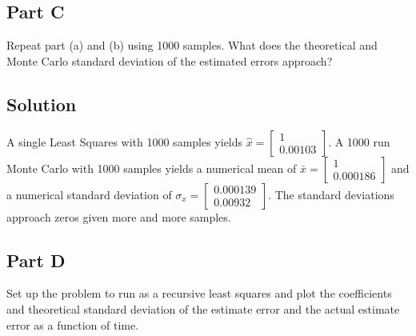 \documentclass{article}
\begin{document}
\subsection*{Part C}
Repeat part (a) and (b) using 1000 samples.  What does the theoretical and Monte Carlo standard deviation of the estimated errors approach?
\subsection*{Solution}
A single Least Squares with 1000 samples yields $\hat{x} = \begin{bmatrix} 1 \\ 0.00103 \end{bmatrix}$.  A 1000 run Monte Carlo with 1000 
samples yields a numerical mean of $\bar{x} = \begin{bmatrix} 1 \\ 0.000186 \end{bmatrix}$ and a numerical standard deviation of 
$\sigma_x = \begin{bmatrix} 0.000139 \\ 0.00932 \end{bmatrix}$.  The standard deviations approach zeros given more and more samples.

\subsection*{Part D}
Set up the problem to run as a recursive least squares and plot the coefficients and theoretical standard deviation of the estimate error and 
the actual estimate error as a function of time.
\end{document}
